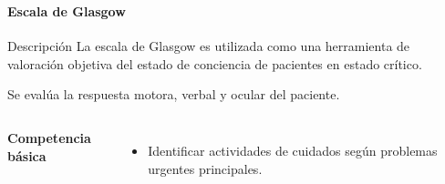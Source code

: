 \begin{frame}
    \frametitle{\pagetitle}
    \framesubtitle{Escala de Glasgow}
    
    \begin{block}{Descripción}
    \centering
    La escala de Glasgow es utilizada como una herramienta de valoración
    objetiva del estado de conciencia de pacientes en estado crítico. 
    
    Se evalúa la respuesta motora, verbal y ocular del paciente.
    \end{block}

	\begin{columns}
	 \hspace{0.5cm}
    \centering
    
     \hspace{0.5cm}
    \textbf{Competencia básica}
    \begin{itemize}
	\item Identificar actividades de cuidados según problemas urgentes principales.
	\end{itemize}
	\end{columns}

\end{frame}


